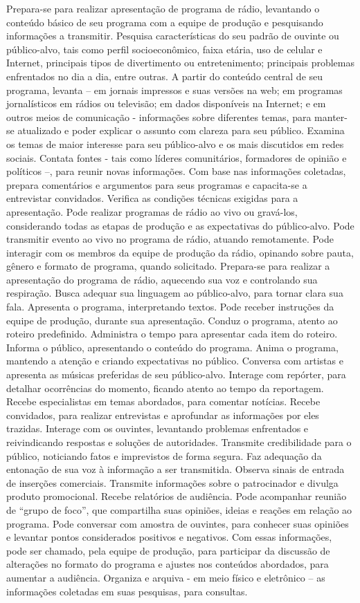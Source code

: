 \documentclass[
]{article}
\begin{document}
Prepara-se para realizar apresentação de programa de rádio, levantando o
conteúdo básico de seu programa com a equipe de produção e pesquisando
informações a transmitir. Pesquisa características do seu padrão de
ouvinte ou público-alvo, tais como perfil socioeconômico, faixa etária,
uso de celular e Internet, principais tipos de divertimento ou
entretenimento; principais problemas enfrentados no dia a dia, entre
outras. A partir do conteúdo central de seu programa, levanta -- em
jornais impressos e suas versões na web; em programas jornalísticos em
rádios ou televisão; em dados disponíveis na Internet; e em outros meios
de comunicação - informações sobre diferentes temas, para manter-se
atualizado e poder explicar o assunto com clareza para seu público.
Examina os temas de maior interesse para seu público-alvo e os mais
discutidos em redes sociais. Contata fontes - tais como líderes
comunitários, formadores de opinião e políticos --, para reunir novas
informações. Com base nas informações coletadas, prepara comentários e
argumentos para seus programas e capacita-se a entrevistar convidados.
Verifica as condições técnicas exigidas para a apresentação. Pode
realizar programas de rádio ao vivo ou gravá-los, considerando todas as
etapas de produção e as expectativas do público-alvo. Pode transmitir
evento ao vivo no programa de rádio, atuando remotamente. Pode interagir
com os membros da equipe de produção da rádio, opinando sobre pauta,
gênero e formato de programa, quando solicitado. Prepara-se para
realizar a apresentação do programa de rádio, aquecendo sua voz e
controlando sua respiração. Busca adequar sua linguagem ao público-alvo,
para tornar clara sua fala. Apresenta o programa, interpretando textos.
Pode receber instruções da equipe de produção, durante sua apresentação.
Conduz o programa, atento ao roteiro predefinido. Administra o tempo
para apresentar cada item do roteiro. Informa o público, apresentando o
conteúdo do programa. Anima o programa, mantendo a atenção e criando
expectativas no público. Conversa com artistas e apresenta as músicas
preferidas de seu público-alvo. Interage com repórter, para detalhar
ocorrências do momento, ficando atento ao tempo da reportagem. Recebe
especialistas em temas abordados, para comentar notícias. Recebe
convidados, para realizar entrevistas e aprofundar as informações por
eles trazidas. Interage com os ouvintes, levantando problemas
enfrentados e reivindicando respostas e soluções de autoridades.
Transmite credibilidade para o público, noticiando fatos e imprevistos
de forma segura. Faz adequação da entonação de sua voz à informação a
ser transmitida. Observa sinais de entrada de inserções comerciais.
Transmite informações sobre o patrocinador e divulga produto
promocional. Recebe relatórios de audiência. Pode acompanhar reunião de
``grupo de foco'', que compartilha suas opiniões, ideias e reações em
relação ao programa. Pode conversar com amostra de ouvintes, para
conhecer suas opiniões e levantar pontos considerados positivos e
negativos. Com essas informações, pode ser chamado, pela equipe de
produção, para participar da discussão de alterações no formato do
programa e ajustes nos conteúdos abordados, para aumentar a audiência.
Organiza e arquiva - em meio físico e eletrônico -- as informações
coletadas em suas pesquisas, para consultas.
\end{document}
